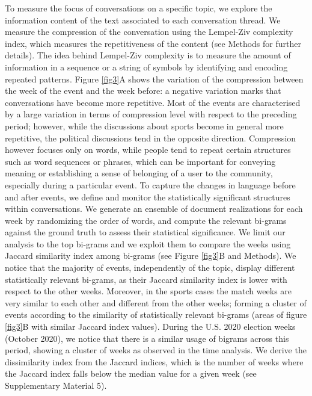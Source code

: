 \documentclass[fleqn,10pt]{wlscirep}
\begin{document}
To measure the focus of conversations on a specific topic, we explore the information content of the text associated to each conversation thread.
We measure the compression of the conversation using the Lempel-Ziv complexity index, which measures the repetitiveness of the content (see Methods for further details). 
The idea behind Lempel-Ziv complexity is to measure the amount of information in a sequence or a string of symbols by identifying and encoding repeated patterns. 
Figure \ref{fig3}A shows the variation of the compression between the week of the event and the week before: a negative variation marks that conversations have become more repetitive. 
Most of the events are characterised by a large variation in terms of compression level with respect to the preceding period; however, while the discussions about sports become in general more repetitive, the political discussions tend in the opposite direction.
Compression however focuses only on words, while people tend to repeat certain structures such as word sequences or phrases, which can be important for conveying meaning or establishing a sense of belonging of a user to the community, especially during a particular event.
To capture the changes in language before and after events, we define and monitor the statistically significant structures within conversations. We generate an ensemble of document realizations for each week by randomizing the order of words, and compute the relevant bi-grams against the ground truth to assess their statistical significance.
We limit our analysis to the top bi-grams and we exploit them to compare the weeks using Jaccard similarity index among bi-grams (see Figure \ref{fig3}B and Methods). We notice that the majority of events, independently of the topic, display different statistically relevant bi-grams, as their Jaccard similarity index is lower with respect to the other weeks.
Moreover, in the sports cases the match weeks are very similar to each other and different from the other weeks; forming a cluster of events according to the similarity of statistically relevant bi-grams (areas of figure \ref{fig3}B with similar Jaccard index values). 
During the U.S. 2020 election weeks (October 2020), we notice that there is a similar usage of bigrams across this period, showing a cluster of weeks as observed in the time analysis. 
We derive the dissimilarity index from the Jaccard indices, which is the number of weeks where the Jaccard index falls below the median value for a given week (see Supplementary Material 5). 
\end{document}
